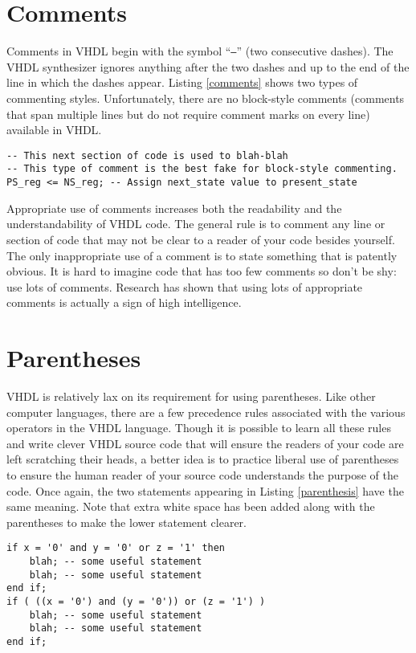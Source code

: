 \section{Comments}
Comments in VHDL begin with the symbol ``\texttt{--}'' (two consecutive dashes). The VHDL synthesizer ignores anything after the two dashes and up to the end of the line in which the dashes appear. Listing \ref{comments} shows two types of commenting styles. Unfortunately, there are no block-style comments (comments that span multiple lines but do not require comment marks on every line) available in VHDL.
\begin{lstlisting}[label=comments, caption=Two typical uses of comments.]
-- This next section of code is used to blah-blah
-- This type of comment is the best fake for block-style commenting.
PS_reg <= NS_reg; -- Assign next_state value to present_state
\end{lstlisting}
Appropriate use of comments increases both the readability and the understandability of VHDL code. The general rule is to comment any line or section of code that may not be clear to a reader of your code besides yourself. The only inappropriate use of a comment is to state something that is patently obvious. It is hard to imagine code that has too few comments so don't be shy: use lots of comments. Research has shown that using lots of appropriate comments is actually a sign of high intelligence.

\section{Parentheses}
VHDL is relatively lax on its requirement for using parentheses. Like other computer languages, there are a few precedence rules associated with the various operators in the VHDL language. Though it is possible to learn all these rules and write clever VHDL source code that will ensure the readers of your code are left scratching their heads, a better idea is to practice liberal use of parentheses to ensure the human reader of your source code understands the purpose of the code. Once again, the two statements appearing in Listing \ref{parenthesis} have the same meaning. Note that extra white space has been added along with the parentheses to make the lower statement clearer. 
\begin{lstlisting}[label=parenthesis, caption=Example of parentheses that can improve clarity.]
if x = '0' and y = '0' or z = '1' then
	blah; -- some useful statement
	blah; -- some useful statement
end if;
if ( ((x = '0') and (y = '0')) or (z = '1') )
	blah; -- some useful statement
	blah; -- some useful statement
end if;
\end{lstlisting}

